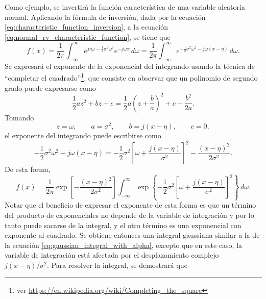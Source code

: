 \documentclass[a4paper]{report}
\begin{document}
Como ejemplo, se invertirá la función característica de una variable aleatoria normal. Aplicando la fórmula de inversión, dada por la ecuación \ref{eq:characteristic_function_inversion}, a la ecuación \ref{eq:normal_rv_characteristic_function}, se tiene que
\begin{equation}\label{eq:normal_characteristic_function_inversion}
  f(x)=\frac{1}{2\pi}\int_{-\infty}^{\infty}e^{j\eta\omega-\frac{1}{2}\sigma^2\omega^2}e^{-j\omega x}\,d\omega
 =\frac{1}{2\pi}\int_{-\infty}^{\infty}e^{-\frac{1}{2}\sigma^2\omega^2-j\omega(x-\eta)}\,d\omega.
\end{equation}
Se expresará el exponente de la exponencial del integrando usando la técnica de ``completar el cuadrado''\footnote{ver \url{https://en.wikipedia.org/wiki/Completing_the_square}}, que consiste en observar que un polinomio de segundo grado puede expresarse como
\begin{equation}\label{eq:complete_squares_one_variable}
 \frac{1}{2}az^2+bz+c=\frac{1}{2}a\left(z+\frac{b}{a}\right)^2+c-\frac{b^2}{2a}.
\end{equation}
Tomando
\[
 z=\omega,\qquad a=\sigma^2,\qquad b=j(x-\eta),\qquad c=0,
\]
el exponente del integrando puede escribirse como
\[
 -\frac{1}{2}\sigma^2\omega^2-j\omega(x-\eta)=-\frac{1}{2}\sigma^2\left[\omega+\frac{j(x-\eta)}{\sigma^2}\right]^2-\frac{(x-\eta)^2}{2\sigma^2}.
\]
De esta forma,
\begin{equation}\label{eq:gaussian_integral_complex_offset_tmp1}
 f(x)=\frac{1}{2\pi}\exp\left[-\frac{(x-\eta)^2}{2\sigma^2}\right]\int_{-\infty}^{\infty}\exp\left\{-\frac{1}{2}\sigma^2\left[\omega+\frac{j(x-\eta)}{\sigma^2}\right]^2\right\}\,d\omega.
\end{equation}
Notar que el beneficio de expresar el exponente de esta forma es que un término del producto de exponenciales no depende de la variable de integración y por lo tanto puede sacarse de la integral, y el otro término es una exponencial con exponente al cuadrado. Se obtiene entonces una integral gaussiana similar a la de la ecuación \ref{eq:gaussian_integral_with_alpha}, excepto que en este caso, la variable de integración está afectada por el desplazamiento complejo \(j(x-\eta)/\sigma^2\). Para resolver la integral, se demostrará que \cite{smith2011spectral_chap_gaussian}
\end{document}
